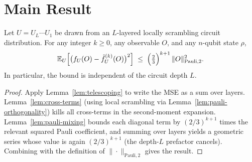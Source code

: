 

\chapter{Main Result}

\begin{theorem}
  \label{thm:mse-bound}
  Let $U = U_L \cdots U_1$ be drawn from an $L$-layered locally scrambling circuit
  distribution.  For any integer $k \geq 0$, any observable $O$, and any $n$-qubit
  state $\rho$,
  \[
    \mathbb{E}_U\!\left[\bigl(f_U(O) - \tilde{f}_U^{(k)}(O)\bigr)^2\right]
    \;\leq\;
    \Bigl(\tfrac{2}{3}\Bigr)^{k+1}\,\|O\|_{\mathrm{Pauli},2}^2.
  \]
  In particular, the bound is independent of the circuit depth $L$.
\end{theorem}

\begin{proof}
  Apply Lemma~\ref{lem:telescoping} to write the MSE as a sum over layers.
  Lemma~\ref{lem:cross-terms} (using local scrambling via
  Lemma~\ref{lem:pauli-orthogonality}) kills all cross-terms in the second-moment
  expansion.  Lemma~\ref{lem:pauli-mixing} bounds each diagonal term by
  $(2/3)^{k+1}$ times the relevant squared Pauli coefficient, and summing over
  layers yields a geometric series whose value is again $(2/3)^{k+1}$ (the
  depth-$L$ prefactor cancels).  Combining with the definition of
  $\|\cdot\|_{\mathrm{Pauli},2}$ gives the result.
\end{proof}

